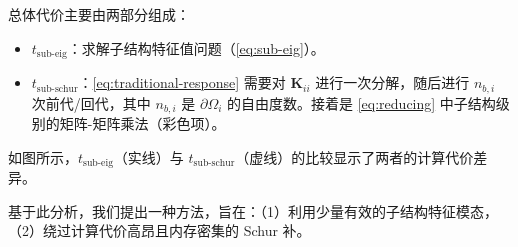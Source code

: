 总体代价主要由两部分组成：
\begin{itemize}
    \item $t_{\text{sub-eig}}$：求解子结构特征值问题（\cref{eq:sub-eig}）。
    \item $t_{\text{sub-schur}}$：\cref{eq:traditional-response}
      需要对 $\mathbf{K}_{ii}$ 进行一次分解，随后进行 $n_{b,i}$ 次前代/回代，其中 $n_{b,i}$ 是 $\partial \Omega_i$ 的自由度数。接着是 \cref{eq:reducing} 中子结构级别的矩阵-矩阵乘法（彩色项）。
\end{itemize}

如图所示，$t_{\text{sub-eig}}$（实线）与 $t_{\text{sub-schur}}$（虚线）的比较显示了两者的计算代价差异。

基于此分析，我们提出一种方法，旨在：（1）利用少量有效的子结构特征模态，（2）绕过计算代价高昂且内存密集的 Schur 补。
